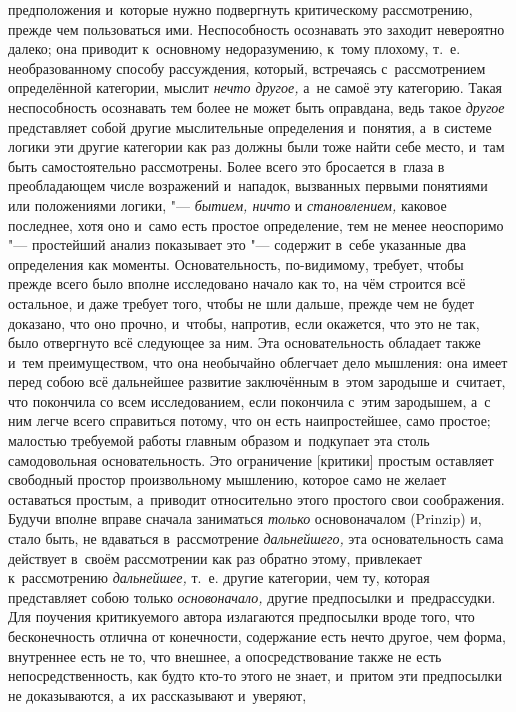 предположения и~которые нужно подвергнуть критическому рассмотрению, прежде чем
пользоваться ими. Неспособность осознавать это заходит невероятно далеко; она
приводит к~основному недоразумению, к~тому плохому, т.~е. необразованному
способу рассуждения, который, встречаясь с~рассмотрением определённой
категории, мыслит {\em нечто другое,} а~не самоё эту категорию. Такая неспособность
осознавать тем более не может быть оправдана, ведь такое {\em другое} представляет собой другие
мыслительные определения и~понятия, а~в системе логики эти другие категории
как раз должны были тоже найти себе место, и~там быть
самостоятельно рассмотрены. Более всего это бросается в~глаза в
преобладающем числе возражений и~нападок, вызванных первыми понятиями или
положениями логики, "--- {\em бытием, ничто} и {\em становлением,} каковое
последнее, хотя оно и~само есть простое определение, тем не менее неоспоримо
"--- простейший анализ показывает это "--- содержит в~себе указанные два
определения как моменты. Основательность, по-видимому, требует, чтобы прежде
всего было вполне исследовано начало как то, на чём строится всё остальное, и
даже требует того, чтобы не шли дальше, прежде чем не будет доказано, что оно
прочно, и~чтобы, напротив, если окажется, что это не так, было отвергнуто всё
следующее за ним. Эта основательность обладает также и~тем преимуществом, что
она необычайно облегчает дело мышления: она имеет перед собою всё дальнейшее
развитие заключённым в~этом зародыше и~считает, что покончила со всем
исследованием, если покончила с~этим зародышем, а~с ним легче всего справиться
потому, что он есть наипростейшее, само простое; малостью требуемой работы
главным образом и~подкупает эта столь самодовольная основательность. Это
ограничение [критики] простым оставляет свободный простор произвольному
мышлению, которое само не желает оставаться простым, а~приводит относительно
этого простого свои соображения. Будучи вполне вправе сначала заниматься
{\em только} основоначалом (Prinzip) и, стало быть, не вдаваться в~рассмотрение
{\em дальнейшего,} эта основательность сама действует в~своём рассмотрении как
раз обратно этому, привлекает к~рассмотрению {\em дальнейшее,} т.~е. другие
категории, чем ту, которая представляет собою только {\em основоначало,} другие
предпосылки и~предрассудки. Для поучения критикуемого автора излагаются
предпосылки вроде того, что бесконечность отлична от конечности, содержание
есть нечто другое, чем форма, внутреннее есть не то, что внешнее, а
опосредствование также не есть непосредственность, как будто кто-то этого не
знает, и~притом эти предпосылки не доказываются, а~их рассказывают и~уверяют,
